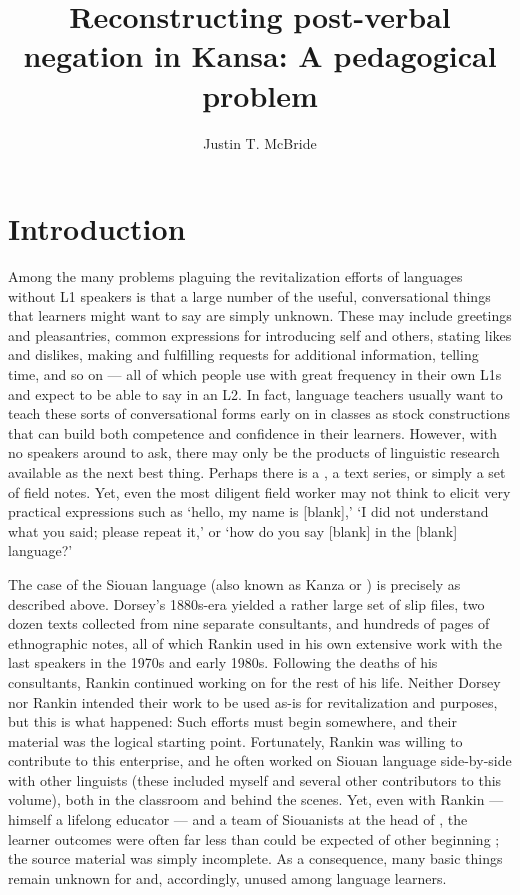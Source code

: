 \documentclass[output=paper]{LSP/langsci}
\author{Justin T. McBride}
\title{Reconstructing post-verbal negation in {Kansa}: {A} pedagogical problem}
\begin{document}
\section{Introduction}
Among the many problems plaguing the revitalization efforts of languages without L1 speakers is that a large number of the useful, conversational things that learners might want to say are simply unknown. These may include greetings and pleasantries, common expressions for introducing self and others, stating likes and dislikes, making and fulfilling requests for additional information, telling time, and so on --- all of which people use with great frequency in their own L1s and expect to be able to say in an L2. In fact, language teachers usually want to teach these sorts of conversational forms early on in classes as stock constructions that can build both competence and confidence in their learners. However, with no speakers around to ask, there may only be the products of linguistic research available as the next best thing. Perhaps there is a , a text series, or simply a set of field notes. Yet, even the most diligent field worker may not think to elicit very practical expressions such as `hello, my name is [blank],' `I did not understand what you said; please repeat it,' or `how do you say [blank] in the [blank] language?' 

The case of the  Siouan language  (also known as Kanza or ) is precisely as described above. Dorsey's 1880s-era  yielded a rather large set of slip files, two dozen texts collected from nine separate consultants, and hundreds of pages of ethnographic notes, all of which Rankin used in his own extensive work with the last  speakers in the 1970s and early 1980s. Following the deaths of his consultants, Rankin continued working on  for the rest of his life. Neither Dorsey nor Rankin intended their work to be used as-is for revitalization and  purposes, but this is what happened: Such efforts must begin somewhere, and their material was the logical starting point. Fortunately, Rankin was willing to contribute to this enterprise, and he often worked on Siouan language  side-by-side with other linguists (these included myself and several other contributors to this volume), both in the classroom and behind the scenes. Yet, even with Rankin --- himself a lifelong educator --- and a team of Siouanists at the head of  , the learner outcomes were often far less than could be expected of other beginning ; the source material was simply incomplete. As a consequence, many basic things remain unknown for  and, accordingly, unused among language learners.
 
\end{document}
